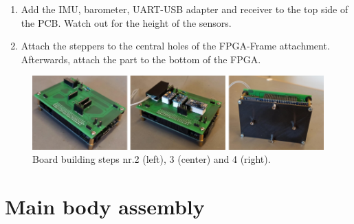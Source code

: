 \begin{enumerate}
    
    \item Add the IMU, barometer, UART-USB adapter and receiver to the top side of the PCB. Watch out for the height of the sensors.
    
    
    \item Attach the steppers to the central holes of the FPGA-Frame attachment. Afterwards, attach the part to the bottom of the FPGA.
    
\end{enumerate}


\begin{figure} [H]
    \centering
    \includegraphics[width=\textwidth]{Figures/build/PCB_FPGA.png}
    \caption{Board building steps nr.2 (left), 3 (center) and 4 (right).}
    \label{fig:build_board}
\end{figure}

\section*{Main body assembly}

